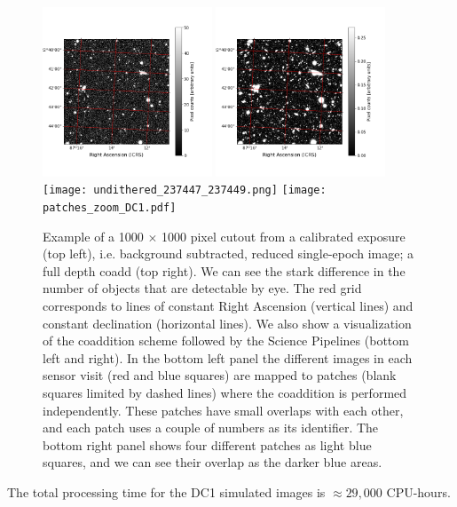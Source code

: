 \documentclass[a4paper,fleqn,usenatbib]{mnras}
\begin{document}
\begin{figure}
\centering
\includegraphics[width=0.45\textwidth]{calexp_example.png}
\includegraphics[width=0.45\textwidth]{coadd_example.png}
\texttt{[image: undithered\_237447\_237449.png]}
\texttt{[image: patches\_zoom\_DC1.pdf]}
\caption{Example of a 1000 $\times$ 1000 pixel cutout from a calibrated exposure (top left), i.e. background subtracted, reduced single-epoch image; a full depth coadd (top right). We can see the stark difference in the number of objects that are detectable by eye. The red grid corresponds to lines of constant Right Ascension (vertical lines) and constant declination (horizontal lines). We also show a visualization of the coaddition scheme followed by the Science Pipelines (bottom left and right). In the bottom left panel the different images in each sensor visit (red and blue squares) are mapped to patches (blank squares limited by dashed lines) where the coaddition is performed independently. These patches have small overlaps with each other, and each patch uses a couple of numbers as its identifier. The bottom right panel shows four different patches as light blue squares, and we can see their overlap as the darker blue areas.}
\label{fig:coadd_example}
\end{figure}

The total processing time for the DC1 simulated images is $\approx 29,000$ CPU-hours.
\end{document}
